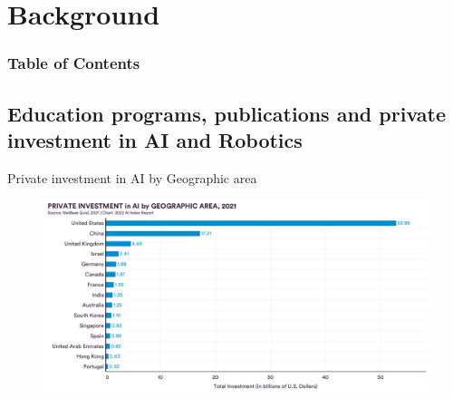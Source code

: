 \section{Background}


\begin{frame}
      \frametitle{Table of Contents}
      \tableofcontents[currentsection]
\end{frame}



\subsection{Education programs, publications and private investment in AI and Robotics}


{

\begin{frame}{
Private investment in AI by Geographic area
}

\begin{figure}
 \centering
 \includegraphics[width=1.0\textwidth]{./figures/progress-of-air-c/outputs/drawing-v01.png}
\end{figure}

\end{frame}
}



